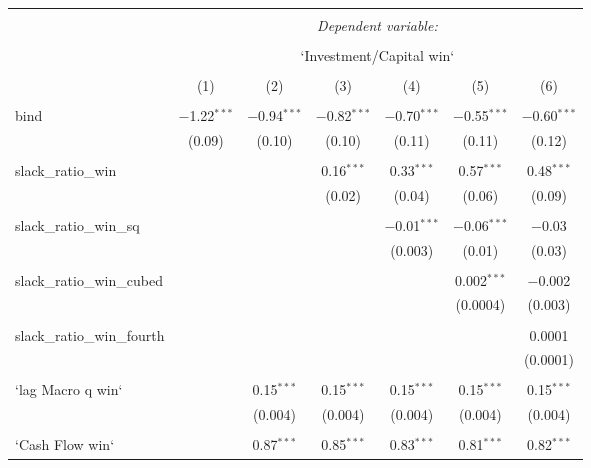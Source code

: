 
\begin{table}[!htbp] \centering 
  \caption{} 
  \label{} 
\begin{tabular}{@{\extracolsep{5pt}}lcccccc} 
\\[-1.8ex]\hline 
\hline \\[-1.8ex] 
 & \multicolumn{6}{c}{\textit{Dependent variable:}} \\ 
\cline{2-7} 
\\[-1.8ex] & \multicolumn{6}{c}{`Investment/Capital win`} \\ 
\\[-1.8ex] & (1) & (2) & (3) & (4) & (5) & (6)\\ 
\hline \\[-1.8ex] 
 bind & $-$1.22$^{***}$ & $-$0.94$^{***}$ & $-$0.82$^{***}$ & $-$0.70$^{***}$ & $-$0.55$^{***}$ & $-$0.60$^{***}$ \\ 
  & (0.09) & (0.10) & (0.10) & (0.11) & (0.11) & (0.12) \\ 
  & & & & & & \\ 
 slack\_ratio\_win &  &  & 0.16$^{***}$ & 0.33$^{***}$ & 0.57$^{***}$ & 0.48$^{***}$ \\ 
  &  &  & (0.02) & (0.04) & (0.06) & (0.09) \\ 
  & & & & & & \\ 
 slack\_ratio\_win\_sq &  &  &  & $-$0.01$^{***}$ & $-$0.06$^{***}$ & $-$0.03 \\ 
  &  &  &  & (0.003) & (0.01) & (0.03) \\ 
  & & & & & & \\ 
 slack\_ratio\_win\_cubed &  &  &  &  & 0.002$^{***}$ & $-$0.002 \\ 
  &  &  &  &  & (0.0004) & (0.003) \\ 
  & & & & & & \\ 
 slack\_ratio\_win\_fourth &  &  &  &  &  & 0.0001 \\ 
  &  &  &  &  &  & (0.0001) \\ 
  & & & & & & \\ 
 `lag Macro q win` &  & 0.15$^{***}$ & 0.15$^{***}$ & 0.15$^{***}$ & 0.15$^{***}$ & 0.15$^{***}$ \\ 
  &  & (0.004) & (0.004) & (0.004) & (0.004) & (0.004) \\ 
  & & & & & & \\ 
 `Cash Flow win` &  & 0.87$^{***}$ & 0.85$^{***}$ & 0.83$^{***}$ & 0.81$^{***}$ & 0.82$^{***}$ \\ 

\end{tabular}
\end{table}
